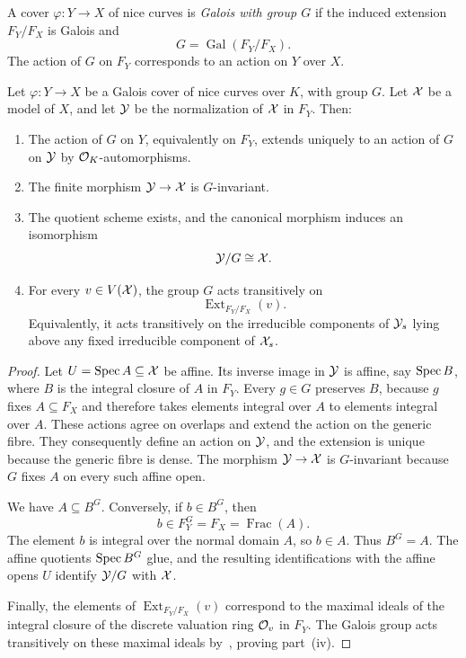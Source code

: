 \begin{definition}\label{def:galois-cover}
    A cover $\varphi\colon Y\to X$ of nice curves is \textit{Galois with group $G$} if the induced extension $F_Y/F_X$ is Galois and
    \[
        G=\operatorname{Gal}(F_Y/F_X).
    \]
    The action of $G$ on $F_Y$ corresponds to an action on $Y$ over $X$.
\end{definition}

\begin{proposition}\label{prop:galois-covers-quotients}
    Let $\varphi\colon Y\to X$ be a Galois cover of nice curves over $K$, with group $G$.
    Let $\mathcal X$ be a model of $X$, and let $\mathcal Y$ be the normalization of $\mathcal X$ in $F_Y$.
    Then:
    \begin{enumerate}[label=\textup{(\roman*)}]
        \item The action of $G$ on $Y$, equivalently on $F_Y$, extends uniquely to an action of $G$ on $\mathcal Y$ by $\mathcal O_K$-automorphisms.
        \item The finite morphism $\mathcal Y\to\mathcal X$ is $G$-invariant.
        \item The quotient scheme exists, and the canonical morphism induces an isomorphism
        \[
            \mathcal Y/G\cong\mathcal X.
        \]
        \item For every $v\in V(\mathcal X)$, the group $G$ acts transitively on
        \[
            \operatorname{Ext}_{F_Y/F_X}(v).
        \]
        Equivalently, it acts transitively on the irreducible components of $\mathcal Y_s$ lying above any fixed irreducible component of $\mathcal X_s$.
    \end{enumerate}
\end{proposition}

\begin{proof}
    Let $U=\operatorname{Spec} A\subseteq\mathcal X$ be affine.
    Its inverse image in $\mathcal Y$ is affine, say $\operatorname{Spec} B$, where $B$ is the integral closure of $A$ in $F_Y$.
    Every $g\in G$ preserves $B$, because $g$ fixes $A\subseteq F_X$ and therefore takes elements integral over $A$ to elements integral over $A$.
    These actions agree on overlaps and extend the action on the generic fibre.
    They consequently define an action on $\mathcal Y$, and the extension is unique because the generic fibre is dense.
    The morphism $\mathcal Y\to\mathcal X$ is $G$-invariant because $G$ fixes $A$ on every such affine open.

    We have $A\subseteq B^G$.
    Conversely, if $b\in B^G$, then
    \[
        b\in F_Y^G=F_X=\operatorname{Frac}(A).
    \]
    The element $b$ is integral over the normal domain $A$, so $b\in A$.
    Thus $B^G=A$.
    The affine quotients $\operatorname{Spec} B^G$ glue, and the resulting identifications with the affine opens $U$ identify $\mathcal Y/G$ with $\mathcal X$.

    Finally, the elements of $\operatorname{Ext}_{F_Y/F_X}(v)$ correspond to the maximal ideals of the integral closure of the discrete valuation ring $\mathcal{O}_v$ in $F_Y$.
    The Galois group acts transitively on these maximal ideals by~\cite[\href{https://stacks.math.columbia.edu/tag/09EA}{Lemma 15.114.1}]{Stacks}, proving part~(iv).
\end{proof}

